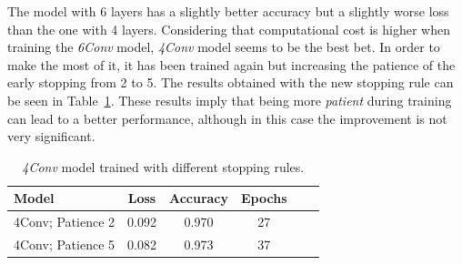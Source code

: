 The model with 6 layers has a slightly better accuracy but a slightly worse loss than the one with 4 layers. Considering that computational cost is higher when training the \textit{6Conv} model, \textit{4Conv} model seems to be the best bet. In order to make the most of it, it has been trained again but increasing the patience of the early stopping from 2 to 5. The results obtained with the new stopping rule can be seen in Table~\ref{tbl:arch_patience5}. These results imply that being more \textit{patient} during training can lead to a better performance, although in this case the improvement is not very significant.
\begin{table}
	\centering
	\begin{tabular}{l*{4}{c}r}
		\textbf{Model} & \textbf{Loss} & \textbf{Accuracy} & \textbf{Epochs} \\
		\hline
		4Conv; Patience 2 & 0.092 & 0.970 & 27 \\
		4Conv; Patience 5 & 0.082 & 0.973 & 37 \\
	\end{tabular}
	\caption{\textit{4Conv} model trained with different stopping rules.}
	\label{tbl:arch_patience5}
\end{table}